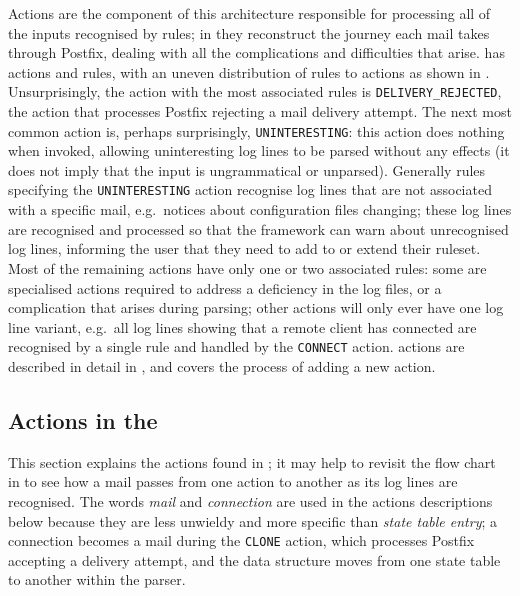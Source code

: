 Actions are the component of this architecture responsible for processing
all of the inputs recognised by rules; in \parsername{} they reconstruct
the journey each mail takes through Postfix, dealing with all the
complications and difficulties that arise.  \parsername{} has
\numberOFactions{} actions and \numberOFrules{} rules, with an uneven
distribution of rules to actions as shown in .  Unsurprisingly, the action with the most associated
rules is \texttt{DELIVERY\_REJECTED}, the action that processes Postfix
rejecting a mail delivery attempt.  The next most common action is, perhaps
surprisingly, \texttt{UNINTERESTING}: this action does nothing when
invoked, allowing uninteresting log lines to be parsed without any effects
(it does not imply that the input is ungrammatical or unparsed).  Generally
rules specifying the \texttt{UNINTERESTING} action recognise log lines that
are not associated with a specific mail, e.g.\ notices about configuration
files changing; these log lines are recognised and processed so that the
framework can warn about unrecognised log lines, informing the user that
they need to add to or extend their ruleset.  Most of the remaining actions
have only one or two associated rules: some are specialised actions
required to address a deficiency in the log files, or a complication that
arises during parsing; other actions will only ever have one log line
variant, e.g.\ all log lines showing that a remote client has connected are
recognised by a single rule and handled by the \texttt{CONNECT} action.
\parsernames{} actions are described in detail in , and  covers the process of adding a new action.


\subsection{Actions in the \parsernamelong{}}

\label{actions in detail in implementation}

This section explains the actions found in \parsername{}; it may help to
revisit the flow chart in  to see how a mail passes
from one action to another as its log lines are recognised.  The words
\textit{mail\/} and \textit{connection\/} are used in the actions
descriptions below because they are less unwieldy and more specific than
\textit{state table entry\/}; a connection becomes a mail during the
\texttt{CLONE} action, which processes Postfix accepting a delivery
attempt, and the data structure moves from one state table to another
within the parser.

